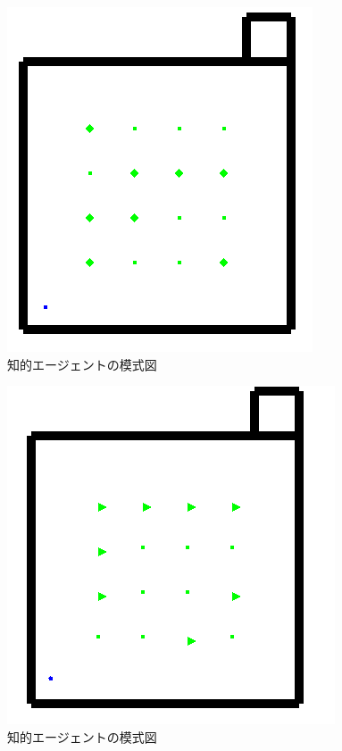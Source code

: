 \begin{figure}[htb]
\begin{center}
 \includegraphics[scale=0.6]{figures/health_urinate.png}
 \caption[知的エージェントの模式図]{知的エージェントの模式図 \label{health_urinate}}
\end{center}
\end{figure}

\begin{figure}[htb]
\begin{center}
 \includegraphics[scale=0.6]{figures/health_frequently_urinate_v1.png}
 \caption[知的エージェントの模式図]{知的エージェントの模式図 \label{health_frequently_urinate_v1}}
\end{center}
\end{figure}

